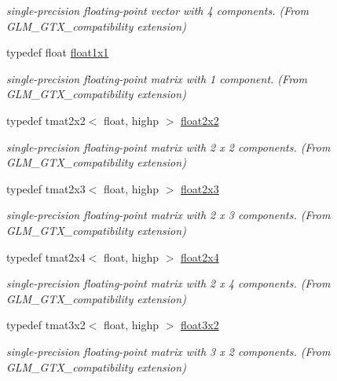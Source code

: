 \begin{DoxyCompactItemize}
\begin{DoxyCompactList}\small\item\em single-\/precision floating-\/point vector with 4 components. (From G\+L\+M\+\_\+\+G\+T\+X\+\_\+compatibility extension) \end{DoxyCompactList}\item 
typedef float \hyperlink{group__gtx__compatibility_gaac1faa940ac1fbb32d4a315005b578af}{float1x1}
\begin{DoxyCompactList}\small\item\em single-\/precision floating-\/point matrix with 1 component. (From G\+L\+M\+\_\+\+G\+T\+X\+\_\+compatibility extension) \end{DoxyCompactList}\item 
typedef tmat2x2$<$ float, highp $>$ \hyperlink{group__gtx__compatibility_ga577dc885086d068647175794909bc026}{float2x2}
\begin{DoxyCompactList}\small\item\em single-\/precision floating-\/point matrix with 2 x 2 components. (From G\+L\+M\+\_\+\+G\+T\+X\+\_\+compatibility extension) \end{DoxyCompactList}\item 
typedef tmat2x3$<$ float, highp $>$ \hyperlink{group__gtx__compatibility_gad4078adf5ec44d1878c63bf2962fbe9e}{float2x3}
\begin{DoxyCompactList}\small\item\em single-\/precision floating-\/point matrix with 2 x 3 components. (From G\+L\+M\+\_\+\+G\+T\+X\+\_\+compatibility extension) \end{DoxyCompactList}\item 
typedef tmat2x4$<$ float, highp $>$ \hyperlink{group__gtx__compatibility_ga33955674c7eee16728dd45fc10dc9547}{float2x4}
\begin{DoxyCompactList}\small\item\em single-\/precision floating-\/point matrix with 2 x 4 components. (From G\+L\+M\+\_\+\+G\+T\+X\+\_\+compatibility extension) \end{DoxyCompactList}\item 
typedef tmat3x2$<$ float, highp $>$ \hyperlink{group__gtx__compatibility_ga2d2b535c9bad9274456ae12676bc6865}{float3x2}
\begin{DoxyCompactList}\small\item\em single-\/precision floating-\/point matrix with 3 x 2 components. (From G\+L\+M\+\_\+\+G\+T\+X\+\_\+compatibility extension) \end{DoxyCompactList}\item 

\end{DoxyCompactItemize}

